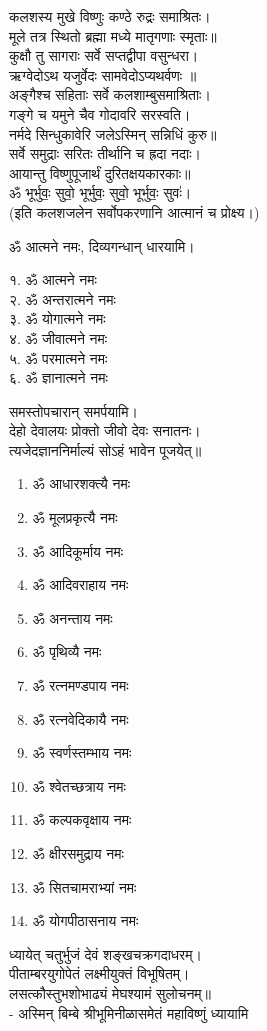 कलशस्य मुखे विष्णुः कण्ठे रुद्रः समाश्रितः।\\
मूले तत्र स्थितो ब्रह्मा मध्ये मातृगणाः स्मृताः॥\\
कुक्षौ तु सागराः सर्वे सप्तद्वीपा वसुन्धरा।\\
ऋग्वेदोऽथ यजुर्वेदः सामवेदोऽप्यथर्वणः ॥\\
अङ्गैश्च सहिताः सर्वे कलशाम्बुसमाश्रिताः।\\
गङ्गे च यमुने चैव गोदावरि सरस्वति।\\
नर्मदे सिन्धुकावेरि जलेऽस्मिन् सन्निधिं कुरु॥\\
सर्वे समुद्राः सरितः तीर्थानि च ह्रदा नदाः।\\
आयान्तु विष्णुपूजार्थं दुरितक्षयकारकाः॥\\
ॐ भूर्भुवः॒ सुवो॒ भूर्भुवः॒ सुवो॒ भूर्भुवः॒ सुवः॑।\\

(इति कलशजलेन सर्वोपकरणानि आत्मानं च प्रोक्ष्य।)

ॐ आत्मने नमः, दिव्यगन्धान् धारयामि।
\begin{multicols}{2}
१. ॐ आत्मने नमः\\
२. ॐ अन्तरात्मने नमः\\
३. ॐ योगात्मने नमः\\
४. ॐ जीवात्मने नमः\\
५. ॐ परमात्मने नमः\\
६. ॐ ज्ञानात्मने नमः
\end{multicols}
समस्तोपचारान् समर्पयामि।\\

देहो देवालयः प्रोक्तो जीवो देवः सनातनः।\\
त्यजेदज्ञाननिर्माल्यं सोऽहं भावेन पूजयेत्॥\\

\begin{multicols}{2}
\begin{enumerate}
\item ॐ आधारशक्त्यै नमः
\item ॐ मूलप्रकृत्यै नमः
\item ॐ आदिकूर्माय नमः 
\item ॐ आदिवराहाय नमः
\item ॐ अनन्ताय नमः
\item ॐ पृथिव्यै नमः
\item ॐ रत्नमण्डपाय नमः
\item ॐ रत्नवेदिकायै नमः
\item ॐ स्वर्णस्तम्भाय नमः
\item ॐ श्वेतच्छत्राय नमः
\item ॐ कल्पकवृक्षाय नमः
\item ॐ क्षीरसमुद्राय नमः 
\item ॐ सितचामराभ्यां नमः
\item ॐ योगपीठासनाय नमः
\end{enumerate}
\end{multicols}
 ध्यायेत् चतुर्भुजं देवं शङ्खचक्रगदाधरम्।\\
पीताम्बरयुगोपेतं लक्ष्मीयुक्तं विभूषितम्। \\
लसत्कौस्तुभशोभाढ्यं मेघश्यामं सुलोचनम्॥\\
- अस्मिन् बिम्बे श्रीभूमिनीळासमेतं महाविष्णुं ध्यायामि\\


